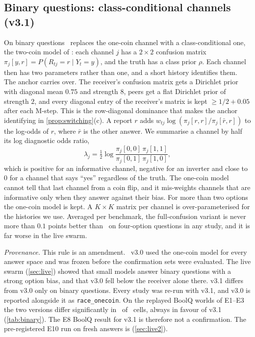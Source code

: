 \subsection{Binary questions: class-conditional channels (v3.1)}\label{sec:binary}
On binary questions \race\ replaces the one-coin channel with a class-conditional one, the two-coin model of \citet{raykar2010}: each channel $j$ has a $2\times2$ confusion matrix $\pi_j[y,r]=P(R_{tj}=r\mid Y_t=y)$, and the truth has a class prior $\rho$. Each channel then has two parameters rather than one, and a short history identifies them. The anchor carries over. The receiver's confusion matrix gets a Dirichlet prior with diagonal mean $0.75$ and strength $8$, peers get a flat Dirichlet prior of strength $2$, and every diagonal entry of the receiver's matrix is kept $\ge 1/2+0.05$ after each M-step. This is the row-diagonal dominance that makes the anchor identifying in \cref{prop:switching}(c). A report $r$ adds $w_{tj}\log(\pi_j[r,r]/\pi_j[\bar r,r])$ to the log-odds of $r$, where $\bar r$ is the other answer. We summarise a channel by half its log diagnostic odds ratio,
\begin{equation}\label{eq:binary}
\lambda_j=\tfrac12\log\frac{\pi_j[0,0]\,\pi_j[1,1]}{\pi_j[0,1]\,\pi_j[1,0]},
\end{equation}
which is positive for an informative channel, negative for an inverter and close to $0$ for a channel that says ``yes'' regardless of the truth. The one-coin model cannot tell that last channel from a coin flip, and it mis-weights channels that are informative only when they answer against their bias. For more than two options the one-coin model is kept. A $K\times K$ matrix per channel is over-parameterised for the histories we use. Averaged per benchmark, the full-confusion variant is never more than $0.1$ points better than \race\ on four-option questions in any study, and it is far worse in the live swarm.

\emph{Provenance.} This rule is an amendment. \race\ v3.0 used the one-coin model for every answer space and was frozen before the confirmation sets were evaluated. The live swarm (\cref{sec:live}) showed that small models answer binary questions with a strong option bias, and that v3.0 fell below the receiver alone there. v3.1 differs from v3.0 only on binary questions. Every study was re-run with v3.1, and v3.0 is reported alongside it as \texttt{race\_onecoin}. On the replayed BoolQ worlds of E1--E3 the two versions differ significantly in \binaryReplayNonTies\ of \binaryReplayCells\ cells, always in favour of v3.1 (\cref{tab:binary}). The E8 BoolQ result for v3.1 is therefore not a confirmation. The pre-registered E10 run on fresh answers is (\cref{sec:live2}).

